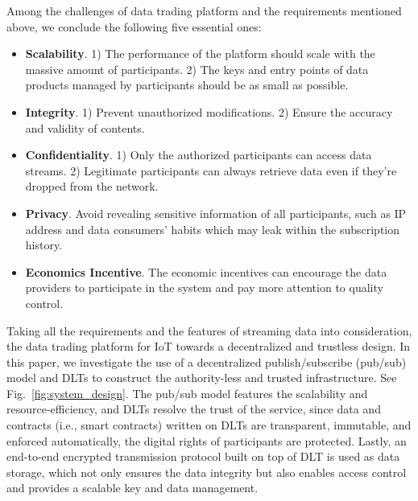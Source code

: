 \documentclass[conference]{IEEEtran}
\begin{document}
Among the challenges of data trading platform\cite{BigDataMarket} and the requirements mentioned above, we conclude the following five essential ones:
\begin{itemize}
    \item \textbf{Scalability}.
1) The performance of the platform should scale with the massive amount of participants. 2) The keys and entry points of data products managed by participants should be as small as possible.
    \item \textbf{Integrity}. 1) Prevent unauthorized modifications. 2) Ensure the accuracy and validity of contents.
    \item \textbf{Confidentiality}.
1) Only the authorized participants can access data streams. 2) Legitimate participants can always retrieve data even if they're dropped from the network.
    \item \textbf{Privacy}. Avoid revealing sensitive information of all participants, such as IP address and data consumers' habits which may leak within the subscription history.
    \item \textbf{Economics Incentive}. The economic incentives can encourage the data providers to participate in the system and pay more attention to quality control.
\end{itemize}

Taking all the requirements and the features of streaming data into consideration, the data trading platform for IoT towards a decentralized and trustless design. In this paper, we investigate the use of a decentralized publish/subscribe (pub/sub) model and DLTs to construct the authority-less and trusted infrastructure. See Fig.~\ref{fig:system_design}. The pub/sub model features the scalability and resource-efficiency, and DLTs resolve the trust of the service, since data and contracts (i.e., smart contracts) written on DLTs are transparent, immutable, and enforced automatically, the digital rights of participants are protected. Lastly, an end-to-end encrypted transmission protocol built on top of DLT is used as data storage, which not only ensures the data integrity but also enables access control and provides a scalable key and data management.
\end{document}
